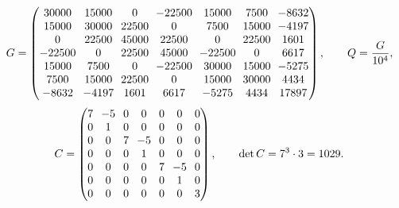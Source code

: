 \begin{equation}\label{eq:gram1029}
\begingroup
\setlength{\arraycolsep}{3.2pt}
G=\begin{pmatrix}
30000&15000&0&-22500&15000&7500&-8632\\
15000&30000&22500&0&7500&15000&-4197\\
0&22500&45000&22500&0&22500&1601\\
-22500&0&22500&45000&-22500&0&6617\\
15000&7500&0&-22500&30000&15000&-5275\\
7500&15000&22500&0&15000&30000&4434\\
-8632&-4197&1601&6617&-5275&4434&17897
\end{pmatrix},\qquad Q=\frac{G}{10^{4}},
\endgroup
\end{equation}
\begin{equation}\label{eq:sub1029}
\begingroup
\setlength{\arraycolsep}{3.6pt}
C=\begin{pmatrix}
7&-5&0&0&0&0&0\\
0&1&0&0&0&0&0\\
0&0&7&-5&0&0&0\\
0&0&0&1&0&0&0\\
0&0&0&0&7&-5&0\\
0&0&0&0&0&1&0\\
0&0&0&0&0&0&3
\end{pmatrix},\qquad \det C=7^3\cdot3=1029 .
\endgroup
\end{equation}
